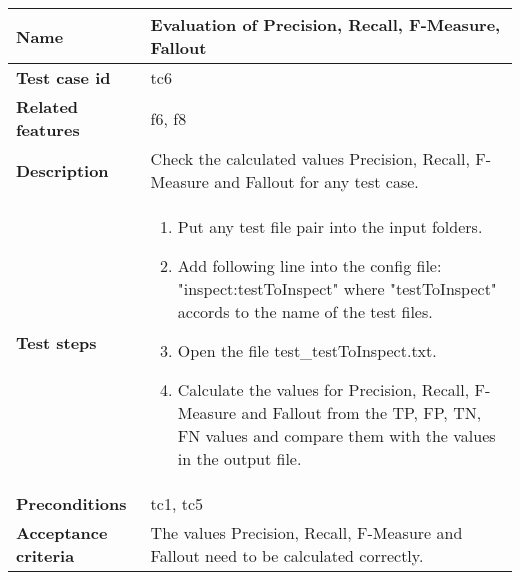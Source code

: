 	\begin{tabular}{ | p{3.5cm} | p{12cm} |}
	\hline
	\textbf{Name} 					& Evaluation of Precision, Recall, F-Measure, Fallout 		\\ 	\hline
	\textbf{Test case id} 			& tc6 						\\ 	\hline
	\textbf{Related features}		& f6, f8						\\ 	\hline
	\textbf{Description} 			& Check the calculated values  Precision, Recall, F-Measure and Fallout for any test case.	\\ 	\hline
	\textbf{Test steps} 			& 	\begin{enumerate}
											\item{Put any test file pair into the input folders.}
											\item{Add following line into the config file: "inspect:testToInspect" where "testToInspect" accords to the name of the test files. }
											\item{Open the file test\_testToInspect.txt.}
											\item{Calculate the values for Precision, Recall, F-Measure and  Fallout from the TP, FP, TN, FN values and compare them with the values in the output file.}
										\end{enumerate}
																\\ 	\hline
	\textbf{Preconditions} 			& tc1, tc5							\\ 	\hline
	\textbf{Acceptance criteria} 	& The values Precision, Recall, F-Measure and Fallout need to be calculated correctly.	\\ 	\hline
	\end{tabular} \\




